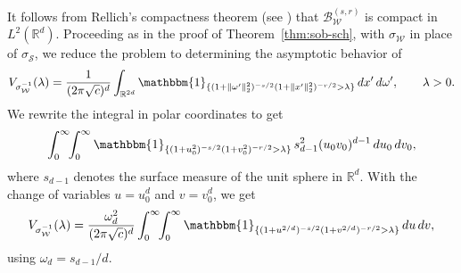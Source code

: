\documentclass[a4paper,12pt]{article}
\newcommand{\R}{\mathbb{R}}
\newcommand{\symbolnotsobw}{\symbolnot_{\mathcal{W}}}
\newcommand{\symbolnotsch}{\symbolnot_{\mathcal{S}}}
\newcommand{\ballweight}{\mathcal{B}^{(s,r)}_{\mathcal{W}}}
\newcommand{\symbolnot}{\sigma}
\begin{document}
It follows from Rellich's compactness theorem (see \cite[Theorem~2.17 and Exercise~2.12]{hinzmicrolocal}) that $\ballweight$ is compact in $L^2(\R^d)$.
Proceeding as in the proof of Theorem~\ref{thm:sob-sch}, with
$\symbolnotsobw$ in place of $\symbolnotsch$,
we reduce the problem to determining the asymptotic behavior of
\begin{equation}\label{eq:integral-volume-weighted-sob1}
V_{\symbolnotsobw^{-1}}(\lambda)
=
\frac{1}{(2\pi\sqrt{c})^{d}}
\int_{\mathbb{R}^{2d}}
\mathbbm{1}_{\{(1+\|\omega'\|_2^2)^{-s/2}(1+\|x'\|_2^2)^{-r/2}>\lambda\}}
\,dx'\,d\omega',
\qquad \lambda>0.
\end{equation}
We rewrite the integral in polar coordinates to get
\[
\int_0^\infty\!\!\int_0^\infty
\mathbbm{1}_{\{(1+u_0^2)^{-s/2}(1+v_0^2)^{-r/2}>\lambda\}}
\,s_{d-1}^2 (u_0v_0)^{d-1}\,du_0\,dv_0,
\]
where $s_{d-1}$ denotes the surface measure of the unit sphere in $\mathbb{R}^d$.
With the change of variables $u=u_0^d$ and $v=v_0^d$, we get
\begin{equation}\label{eq:double-integral-sob-var-ch}
    V_{\symbolnotsobw^{-1}}(\lambda)
    =
    \frac{\omega_d^2}{(2\pi\sqrt{c})^{d}}
    \int_0^\infty\!\!\int_0^\infty
    \mathbbm{1}_{\{(1+u^{2/d})^{-s/2}(1+v^{2/d})^{-r/2}>\lambda\}}
    \,du\,dv,
\end{equation}
using $\omega_d = s_{d-1}/d$.


\end{document}
